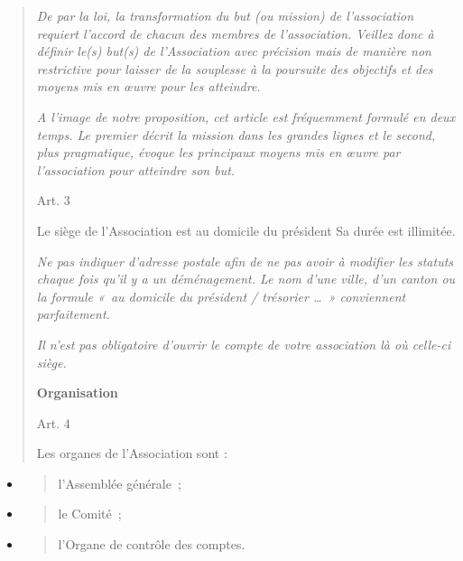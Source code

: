 \documentclass[
]{article}
\begin{document}
\begin{quote}
\emph{De par la loi, la transformation du but (ou mission) de
l'association requiert l'accord de chacun des membres de l'association.
Veillez donc à définir le(s) but(s) de l'Association avec précision mais
de manière non restrictive pour laisser de la souplesse à la poursuite
des objectifs et des moyens mis en œuvre pour les atteindre.}

\emph{A l'image de notre proposition, cet article est fréquemment
formulé en deux temps. Le premier décrit la mission dans les grandes
lignes et le second, plus pragmatique, évoque les principaux moyens mis
en œuvre par l'association pour atteindre son but.}

Art. 3

Le siège de l'Association est  au domicile du président Sa durée est illimitée.

\emph{Ne pas indiquer d'adresse postale afin de ne pas avoir à modifier
les statuts chaque fois qu'il y a un déménagement. Le nom d'une ville,
d'un canton ou la formule «~au domicile du président / trésorier
\ldots~» conviennent parfaitement.}

\emph{Il n'est pas obligatoire d'ouvrir le compte de votre association
là où celle-ci siège.}

\textbf{Organisation}

Art. 4

Les organes de l'Association sont :
\end{quote}

\begin{itemize}
\item
  \begin{quote}
  l'Assemblée générale~;
  \end{quote}
\item
  \begin{quote}
  le Comité~;
  \end{quote}
\item
  \begin{quote}
  l'Organe de contrôle des comptes.
  \end{quote}
\end{itemize}
\end{document}
